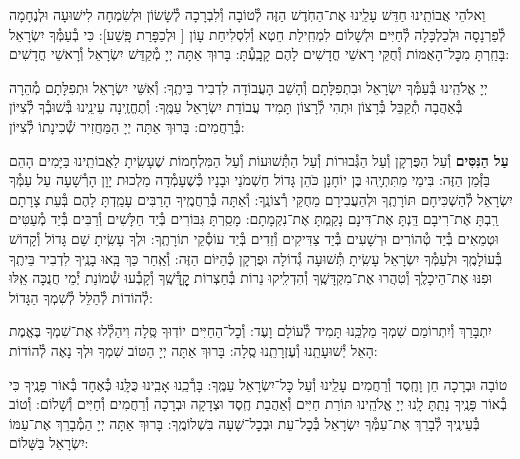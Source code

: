 \documentclass[twoside, openany, parskip=half, 11pt]{book}
\begin{document}
וֵאלֹהֵי אֲבוֹתֵֽינוּ חַדֵּשׁ עָלֵֽינוּ אֶת־הַחֹֽדֶשׁ הַזֶּה לְ֯טוֹבָה וְ֯לִבְרָכָה לְ֯שָׂשׂוֹן וּלְשִׂמְחָה לִישׁוּעָה וּלְנֶחָמָה לְ֯פַרְנָסָה וּלְכַלְכָּלָה לְ֯חַיִּים וּלְשָׁלוֹם לִמְחִֽילַת חֵטְא וְ֯לִסְלִיחַת עָוֹן [
וּלְכַפָּרַת פָּֽשַׁע]: כִּי בְ֯עַמְּ֯ךָ יִשְׂרָאֵל בָּחַֽרְתָּ מִכׇּל־הָאֻמּוֹת וְ֯חֻקֵּי רָאשֵׁי חֳדָשִׁים לָהֶם קָבָֽעְ֯תָּ: בָּרוּךְ אַתָּה יְיָ מְ֯קַדֵּשׁ יִשְׂרָאֵל וְ֯רָאשֵׁי חֳדָשִׁים:

יְיָ אֱלֹהֵֽינוּ בְּ֯עַמְּ֯ךָ יִשְׂרָאֵל וּבִתְפִלָּתָם וְ֯הָשֵׁב הָעֲבוֹדָה לִדְבִיר בֵּיתֶֽךָ: וְ֯אִשֵּׁי יִשְׂרָאֵל וּתְפִלָּתָם מְ֯הֵרָה בְּ֯אַהֲבָה תְ֯קַבֵּל בְּ֯רָצוֹן וּתְהִי לְ֯רָצוֹן תָּמִיד עֲבוֹדַת יִשְׂרָאֵל עַמֶּֽךָ: וְ֯תֶחֱזֶֽינָה עֵינֵֽינוּ בְּ֯שׁוּבְ֯ךָ לְ֯צִיּוֹן בְּ֯רַחֲמִים: בָּרוּךְ אַתָּה יְיָ הַמַּחֲזִיר שְׁ֯כִינָתוֹ לְ֯צִיּוֹן:

\modim

\enlargethispage{\baselineskip}

\begin{sometimes}

\textbf{עַל הַנִּסִּים}
וְ֯עַל הַפֻּרְקָן וְ֯עַל הַגְּ֯בוּרוֹת וְ֯עַל הַתְּ֯שׁוּעוֹת וְ֯עַל הַמִּלְחָמוֹת
שֶׁעָשִֽׂיתָ לַאֲבוֹתֵֽינוּ בַּיָּמִים הָהֵם בַּזְּ֯מַן הַזֶּה:
בִּימֵי מַתִּתְיָֽהוּ בֶּן יוֹחָנָן כֹּהֵן גָּדוֹל חַשְׁמֹנַי וּבָנָיו כְּ֯שֶׁעָמְ֯דָה מַלְכוּת יָוָן הָרְ֯שָׁעָה עַל עַמְּ֯ךָ יִשְׂרָאֵל לְ֯הַשְׁכִּיחָם תּוֹרָתֶֽךָ וּלְהַעֲבִירָם מֵחֻקֵּי רְ֯צוֹנֶֽךָ: וְ֯אַתָּה בְּ֯רַחֲמֶֽיךָ הָרַבִּים עָמַֽדְתָּ לָהֶם בְּ֯עֵת צָרָתָם רַֽבְתָּ אֶת־רִיבָם דַּֽנְתָּ אֶת־דִּינָם נָקַֽמְתָּ אֶת־נִקְמָתָם: מָסַֽרְתָּ גִּבּוֹרִים בְּ֯יַד חַלָּשִׁים וְ֯רַבִּים בְּ֯יַד מְ֯עַטִּים וּטְמֵאִים בְּ֯יַד טְ֯הוֹרִים וּרְשָׁעִים בְּ֯יַד צַדִּיקִים וְ֯זֵדִים בְּ֯יַד עוֹסְ֯קֵי תוֹרָתֶֽךָ: וּלְךָ עָשִֽׂיתָ שֵׁם גָּדוֹל וְ֯קָדוֹשׁ בְּ֯עוֹלָמֶֽךָ וּלְעַמְּ֯ךָ יִשְׂרָאֵל עָשִֽׂיתָ תְּ֯שׁוּעָה גְ֯דוֹלָה וּפֻרְקָן כְּ֯הַיּוֹם הַזֶּה: וְ֯אַֽחַר כַּךְ בָּֽאוּ בָנֶֽיךָ לִדְבִיר בֵּיתֶֽךָ וּפִנּוּ אֶת־הֵיכָלֶֽךָ וְ֯טִהֲרוּ אֶת־מִקְדָּשֶֽׁךָ וְ֯הִדְלִֽיקוּ נֵרוֹת בְּ֯חַצְרוֹת קׇׇׇׇׇׇׇׇדְּ֯שֶֽׁךָ וְ֯קָבְ֯עוּ שְׁ֯מוֹנַת יְ֯מֵי חֲנֻכָּה אֵֽלּוּ לְ֯הוֹדוֹת לְ֯הַלֵּל לְ֯שִׁמְךָ הַגָּדוֹל:

\end{sometimes}

\nextpage

יִתְבָּרַךְ וְ֯יִתְרוֹמַם שִׁמְךָ מַלְכֵּֽנוּ תָּמִיד לְ֯עוֹלָם וָעֶד:
וְ֯כׇל־הַחַיִּים יוֹדֽוּךָ סֶּֽלָה וִיהַלְ֯לוּ אֶת־שִׁמְךָ בֶּאֱמֶת הָאֵל יְ֯שׁוּעָתֵֽנוּ וְ֯עֶזְרָתֵֽנוּ סֶֽלָה: בָּרוּךְ אַתָּה יְיָ הַטּוֹב שִׁמְךָ וּלְךָ נָאֶה לְ֯הוֹדוֹת:

\shatzbrikaskohanim

טוֹבָה וּבְרָכָה חֵן וָחֶֽסֶד וְ֯רַחֲמִים עָלֵֽינוּ וְ֯עַל כׇּל־יִשְׂרָאֵל עַמֶּֽךָ: בָּרְ֯כֵֽנוּ אָבִֽינוּ כֻּלָּֽנוּ כְּ֯אֶחָד בְּ֯אוֹר פָּנֶֽיךָ כִּי בְ֯אוֹר פָּנֶֽיךָ נָתַֽתָּ לָֽנוּ יְיָ אֱלֹהֵֽינוּ תּוֹרַת חַיִּים וְ֯אַהֲבַת חֶֽסֶד וּצְדָקָה וּבְרָכָה וְ֯רַחֲמִים וְ֯חַיִּים וְ֯שָׁלוֹם: וְ֯טוֹב בְּ֯עֵינֶֽיךָ לְ֯בָרֵךְ אֶת־עַמְּ֯ךָ יִשְׂרָאֵל בְּ֯כׇל־עֵת וּבְכׇל־שָׁעָה בִּשְׁלוֹמֶֽךָ: בָּרוּךְ אַתָּה יְיָ הַמְ֯בָרֵךְ אֶת־עַמּוֹ יִשְׂרָאֵל בַּשָּׁלוֹם:
\end{document}
